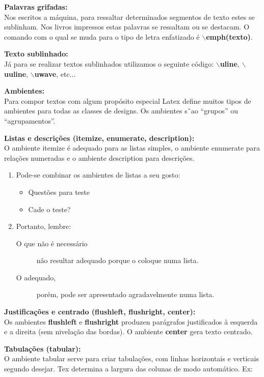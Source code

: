 \documentclass[a4paper, 12pt]{article}
\begin{document}
\begin{flushleft}
\textbf{Palavras grifadas:}
\\
Nos escritos a máquina, para ressaltar determinados segmentos de texto estes se sublinham. Nos livros impressos estas palavras se ressaltam ou se destacam. O comando com o qual se muda para o tipo de letra enfatizado é \textbf{$\backslash$emph(texto)}. \singlespacing

\textbf{Texto sublinhado:}
\\
Já para se realizar textos sublinhados utilizamos o seguinte código: \textbf{$\backslash$uline}, \textbf{$\backslash$uuline}, \textbf{$\backslash$uwave}, etc... \singlespacing

\textbf{Ambientes:}
\\
Para compor textos com algum propósito especial Latex define muitos tipos de ambientes para todas as classes de designs. Os ambientes s˜ao “grupos” ou “agrupamentos”. \singlespacing

\textbf{Listas e descrições (itemize, enumerate, description):}
\\
O ambiente itemize é adequado para as listas simples, o ambiente enumerate para relações numeradas e o ambiente description para descrições.
\\
\begin{enumerate}
\item Pode-se combinar os ambientes de listas a seu gosto:
\begin{itemize}
\item Questões para teste 
\item Cade o teste?
\end{itemize}
\item Portanto, lembre:
\begin{description} 
\item[O que não é necessário] não resultar adequado porque o coloque numa lista.
\item[O adequado,] porém, pode ser apresentado agradavelmente numa lista. 
\end{description}
\end{enumerate}

\singlespacing

\textbf{Justificações e centrado (flushleft, flushright, center):}
\\
Os ambientes \textbf{flushleft} e \textbf{flushright} produzen parágrafos justificados à esquerda e a direita (sem nivelação das bordas). O ambiente \textbf{center} gera texto centrado.  \singlespacing

\textbf{Tabulações (tabular):}
\\
O ambiente tabular serve para criar tabulações, com linhas horizontais e verticais segundo desejar. Tex determina a largura das colunas de modo automático. Ex:
\\
\begin{center}


\end{center}
\end{flushleft}
\end{document}
